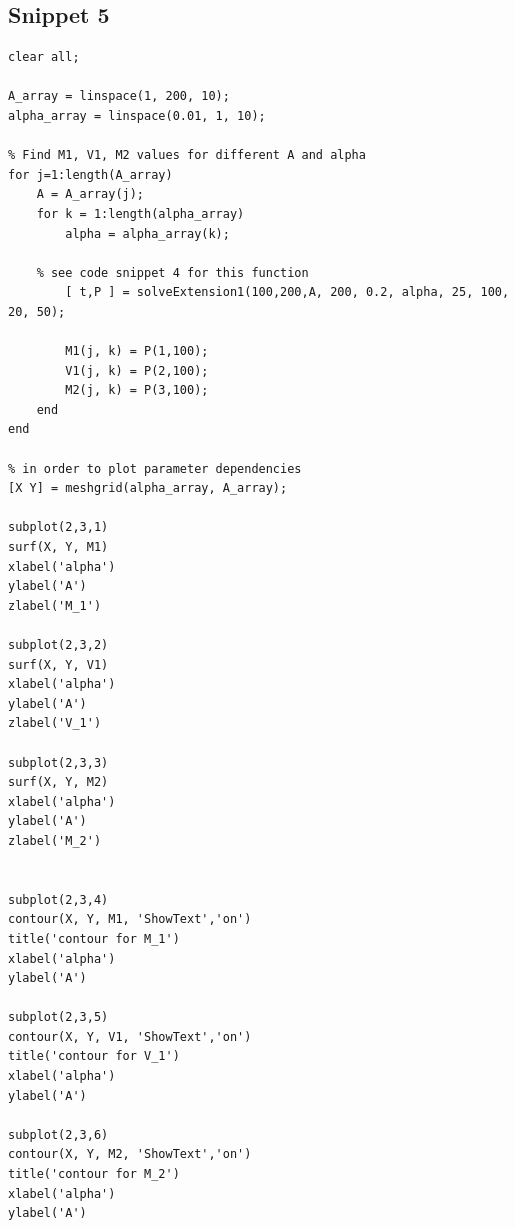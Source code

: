 \documentclass[12pt]{article}
\begin{document}
\subsection{Snippet 5}
\begin{verbatim}
clear all;

A_array = linspace(1, 200, 10);
alpha_array = linspace(0.01, 1, 10);

% Find M1, V1, M2 values for different A and alpha
for j=1:length(A_array)
    A = A_array(j);
    for k = 1:length(alpha_array)
        alpha = alpha_array(k);
        
	% see code snippet 4 for this function
        [ t,P ] = solveExtension1(100,200,A, 200, 0.2, alpha, 25, 100, 20, 50);
         
        M1(j, k) = P(1,100);
        V1(j, k) = P(2,100);
        M2(j, k) = P(3,100);
    end 
end

% in order to plot parameter dependencies
[X Y] = meshgrid(alpha_array, A_array);

subplot(2,3,1)
surf(X, Y, M1)
xlabel('alpha')
ylabel('A')
zlabel('M_1')

subplot(2,3,2)
surf(X, Y, V1)
xlabel('alpha')
ylabel('A')
zlabel('V_1')

subplot(2,3,3)
surf(X, Y, M2)
xlabel('alpha')
ylabel('A')
zlabel('M_2')


subplot(2,3,4)
contour(X, Y, M1, 'ShowText','on')
title('contour for M_1')
xlabel('alpha')
ylabel('A')

subplot(2,3,5)
contour(X, Y, V1, 'ShowText','on')
title('contour for V_1')
xlabel('alpha')
ylabel('A')

subplot(2,3,6)
contour(X, Y, M2, 'ShowText','on')
title('contour for M_2')
xlabel('alpha')
ylabel('A')

\end{verbatim}
\end{document}

